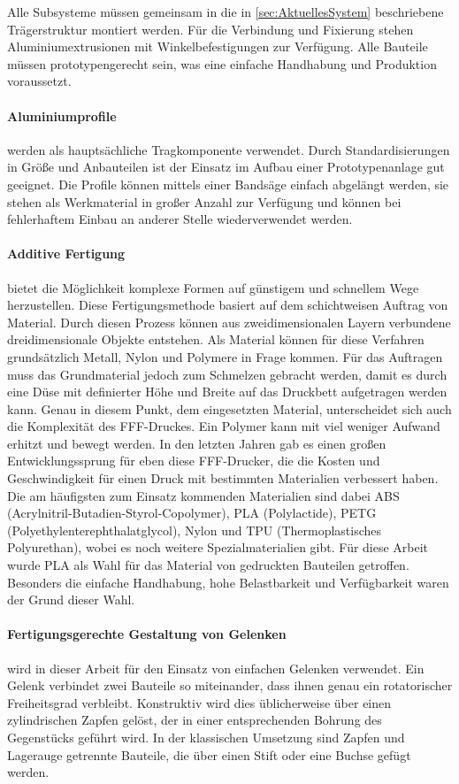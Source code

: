 Alle Subsysteme müssen gemeinsam in die in \cref{sec:AktuellesSystem} beschriebene Trägerstruktur montiert werden. Für die Verbindung
und Fixierung stehen Aluminiumextrusionen mit Winkelbefestigungen zur Verfügung. Alle Bauteile müssen prototypengerecht sein, was
eine einfache Handhabung und Produktion voraussetzt.

\paragraph{Aluminiumprofile} werden als hauptsächliche Tragkomponente verwendet. Durch Standardisierungen in Größe und Anbauteilen
ist der Einsatz im Aufbau einer Prototypenanlage gut geeignet. Die Profile können mittels einer Bandsäge einfach abgelängt werden,
sie stehen als Werkmaterial in großer Anzahl zur Verfügung und können bei fehlerhaftem Einbau an anderer Stelle wiederverwendet werden.

\paragraph{Additive Fertigung} bietet die Möglichkeit komplexe Formen auf günstigem und schnellem Wege herzustellen. Diese Fertigungsmethode
basiert auf dem schichtweisen Auftrag von Material. Durch diesen Prozess können aus zweidimensionalen Layern verbundene
dreidimensionale Objekte entstehen. Als Material können für diese Verfahren grundsätzlich Metall, Nylon und Polymere in Frage kommen.
Für das Auftragen muss das Grundmaterial jedoch zum Schmelzen gebracht werden, damit es durch eine Düse mit definierter Höhe und Breite
auf das Druckbett aufgetragen werden kann. Genau in diesem Punkt, dem eingesetzten Material, unterscheidet sich auch die Komplexität des FFF-Druckes.
Ein Polymer kann mit viel weniger Aufwand erhitzt und bewegt werden. In den letzten Jahren gab es einen großen Entwicklungssprung
für eben diese FFF-Drucker, die die Kosten und Geschwindigkeit für einen Druck mit bestimmten Materialien verbessert haben.
Die am häufigsten zum Einsatz kommenden Materialien sind dabei ABS (Acrylnitril-Butadien-Styrol-Copolymer), PLA (Polylactide), PETG (Polyethylenterephthalatglycol),
Nylon und TPU (Thermoplastisches Polyurethan), wobei es noch weitere Spezialmaterialien gibt. Für diese Arbeit wurde
PLA als Wahl für das Material von gedruckten Bauteilen getroffen. Besonders die einfache Handhabung, hohe Belastbarkeit und
Verfügbarkeit waren der Grund dieser Wahl.

\paragraph{Fertigungsgerechte Gestaltung von Gelenken} wird in dieser Arbeit für den Einsatz von einfachen Gelenken verwendet.
Ein Gelenk verbindet zwei Bauteile so miteinander, dass ihnen genau ein rotatorischer Freiheitsgrad verbleibt. Konstruktiv wird
dies üblicherweise über einen zylindrischen Zapfen gelöst, der in einer entsprechenden Bohrung des Gegenstücks geführt wird. In
der klassischen Umsetzung sind Zapfen und Lagerauge getrennte Bauteile, die über einen Stift oder eine Buchse gefügt werden.

